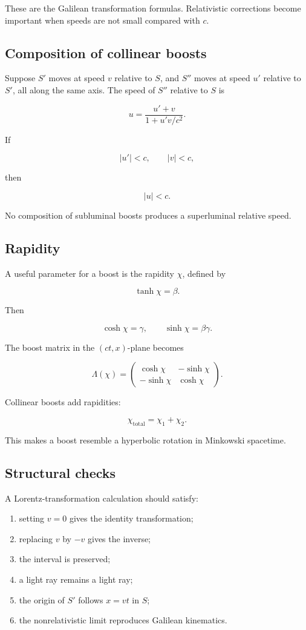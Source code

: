 These are the Galilean transformation formulas. Relativistic corrections become important when speeds are not small compared with \(c\).

\subsection{Composition of collinear boosts}

Suppose \(S'\) moves at speed \(v\) relative to \(S\), and \(S''\) moves at speed \(u'\) relative to \(S'\), all along the same axis. The speed of \(S''\) relative to \(S\) is

\[
\boxed{
u
=
\frac{u'+v}
{1+u'v/c^{2}}
}.
\]

If

\[
|u'|<c,
\qquad
|v|<c,
\]

then

\[
|u|<c.
\]

No composition of subluminal boosts produces a superluminal relative speed.

\subsection{Rapidity}

A useful parameter for a boost is the rapidity \(\chi\), defined by

\[
\tanh\chi=\beta.
\]

Then

\[
\cosh\chi=\gamma,
\qquad
\sinh\chi=\beta\gamma.
\]

The boost matrix in the \((ct,x)\)-plane becomes

\[
\Lambda(\chi)
=
\begin{pmatrix}
\cosh\chi&-\sinh\chi\\
-\sinh\chi&\cosh\chi
\end{pmatrix}.
\]

Collinear boosts add rapidities:

\[
\chi_{\mathrm{total}}
=
\chi_{1}+\chi_{2}.
\]

This makes a boost resemble a hyperbolic rotation in Minkowski spacetime.

\subsection{Structural checks}

A Lorentz-transformation calculation should satisfy:

\begin{enumerate}
    \item setting \(v=0\) gives the identity transformation;
    \item replacing \(v\) by \(-v\) gives the inverse;
    \item the interval is preserved;
    \item a light ray remains a light ray;
    \item the origin of \(S'\) follows \(x=vt\) in \(S\);
    \item the nonrelativistic limit reproduces Galilean kinematics.
\end{enumerate}

